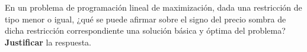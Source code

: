 En un problema de programación lineal de maximización, dada una restricción de tipo menor o igual, ¿qué se puede afirmar sobre el signo del precio sombra de dicha restricción correspondiente una solución básica y óptima del problema? \textbf{Justificar} la respuesta.
